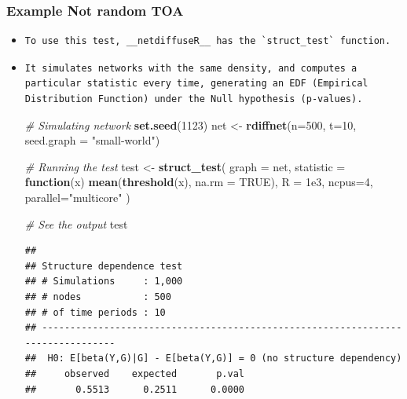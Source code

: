 \documentclass[]{book}
\newenvironment{Shaded}{\begin{snugshade}}{\end{snugshade}}
\newcommand{\CommentTok}[1]{\textcolor[rgb]{0.56,0.35,0.01}{\textit{#1}}}
\newcommand{\ControlFlowTok}[1]{\textcolor[rgb]{0.13,0.29,0.53}{\textbf{#1}}}
\newcommand{\DataTypeTok}[1]{\textcolor[rgb]{0.13,0.29,0.53}{#1}}
\newcommand{\DecValTok}[1]{\textcolor[rgb]{0.00,0.00,0.81}{#1}}
\newcommand{\FloatTok}[1]{\textcolor[rgb]{0.00,0.00,0.81}{#1}}
\newcommand{\KeywordTok}[1]{\textcolor[rgb]{0.13,0.29,0.53}{\textbf{#1}}}
\newcommand{\NormalTok}[1]{#1}
\newcommand{\OtherTok}[1]{\textcolor[rgb]{0.56,0.35,0.01}{#1}}
\newcommand{\StringTok}[1]{\textcolor[rgb]{0.31,0.60,0.02}{#1}}
\begin{document}
\hypertarget{example-not-random-toa}{%
\subsubsection{Example Not random TOA}\label{example-not-random-toa}}

\begin{itemize}
\item
\begin{verbatim}
To use this test, __netdiffuseR__ has the `struct_test` function.
\end{verbatim}
\item
\begin{verbatim}
It simulates networks with the same density, and computes a particular statistic every time, generating an EDF (Empirical Distribution Function) under the Null hypothesis (p-values).
\end{verbatim}

\begin{Shaded}
\begin{Highlighting}[]
\CommentTok{# Simulating network}
\KeywordTok{set.seed}\NormalTok{(}\DecValTok{1123}\NormalTok{)}
\NormalTok{net <-}\StringTok{ }\KeywordTok{rdiffnet}\NormalTok{(}\DataTypeTok{n=}\DecValTok{500}\NormalTok{, }\DataTypeTok{t=}\DecValTok{10}\NormalTok{, }\DataTypeTok{seed.graph =} \StringTok{"small-world"}\NormalTok{)}

\CommentTok{# Running the test}
\NormalTok{test <-}\StringTok{ }\KeywordTok{struct_test}\NormalTok{(}
  \DataTypeTok{graph     =}\NormalTok{ net, }
  \DataTypeTok{statistic =} \ControlFlowTok{function}\NormalTok{(x) }\KeywordTok{mean}\NormalTok{(}\KeywordTok{threshold}\NormalTok{(x), }\DataTypeTok{na.rm =} \OtherTok{TRUE}\NormalTok{),}
  \DataTypeTok{R         =} \FloatTok{1e3}\NormalTok{,}
  \DataTypeTok{ncpus=}\DecValTok{4}\NormalTok{, }\DataTypeTok{parallel=}\StringTok{"multicore"}
\NormalTok{  )}

\CommentTok{# See the output}
\NormalTok{test}
\end{Highlighting}
\end{Shaded}

\begin{verbatim}
## 
## Structure dependence test
## # Simulations     : 1,000
## # nodes           : 500
## # of time periods : 10
## --------------------------------------------------------------------------------
##  H0: E[beta(Y,G)|G] - E[beta(Y,G)] = 0 (no structure dependency)
##     observed    expected       p.val
##       0.5513      0.2511      0.0000
\end{verbatim}
\end{itemize}
\end{document}
